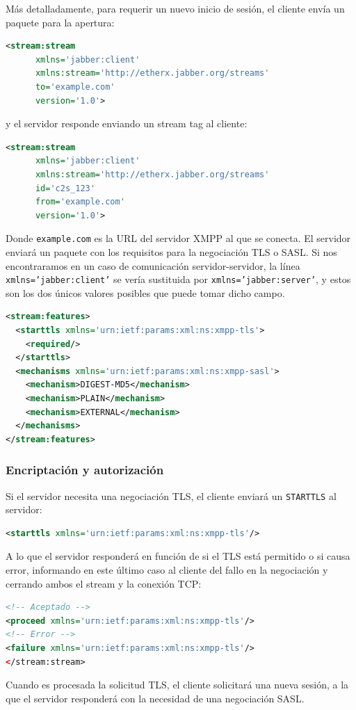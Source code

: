 \documentclass[a4paper, 11pt]{article} %
\begin{document}
      Más detalladamente, para requerir un nuevo inicio de sesión, el cliente envía un paquete para la apertura:
      \begin{lstlisting}[language=XML] 
<stream:stream 
	  xmlns='jabber:client'
	  xmlns:stream='http://etherx.jabber.org/streams'
	  to='example.com' 
	  version='1.0'>
      \end{lstlisting}
      y el servidor responde enviando un stream tag al cliente:
      \begin{lstlisting}[language=XML] 
<stream:stream
	  xmlns='jabber:client'
	  xmlns:stream='http://etherx.jabber.org/streams'
	  id='c2s_123'
	  from='example.com'
	  version='1.0'>
      \end{lstlisting}    
      Donde \texttt{example.com} es la URL del servidor XMPP al que se conecta. El servidor
      enviará un paquete con los requisitos para la negociación TLS o SASL. Si nos encontraramos en un caso de 
      comunicación servidor-servidor, la línea \texttt{xmlns='jabber:client'} se vería sustituida por 
      \texttt{xmlns='jabber:server'}, y estos son los dos únicos valores posibles que puede tomar dicho campo.
      \begin{lstlisting}[language=XML]
<stream:features> 
  <starttls xmlns='urn:ietf:params:xml:ns:xmpp-tls'>    
    <required/>  
  </starttls>  
  <mechanisms xmlns='urn:ietf:params:xml:ns:xmpp-sasl'>    
    <mechanism>DIGEST-MD5</mechanism>    
    <mechanism>PLAIN</mechanism>   
    <mechanism>EXTERNAL</mechanism>  
  </mechanisms> 
</stream:features>
      \end{lstlisting}

  \subsubsection{Encriptación y autorización}
    Si el servidor necesita una negociación TLS, el cliente enviará un \texttt{STARTTLS} al servidor:
    \begin{lstlisting}[language=XML]
<starttls xmlns='urn:ietf:params:xml:ns:xmpp-tls'/>
    \end{lstlisting}
    A lo que el servidor responderá en función de si el TLS está permitido o si causa error, informando en
    este último caso al cliente del fallo en la negociación y cerrando ambos el stream y la conexión TCP:
    \begin{lstlisting}[language=XML]
<!-- Aceptado -->
<proceed xmlns='urn:ietf:params:xml:ns:xmpp-tls'/>
<!-- Error -->
<failure xmlns='urn:ietf:params:xml:ns:xmpp-tls'/> 
</stream:stream>
    \end{lstlisting}
    Cuando es procesada la solicitud TLS, el cliente solicitará una nueva sesión, a la que el servidor
    responderá con la necesidad de una negociación SASL.
\end{document}
